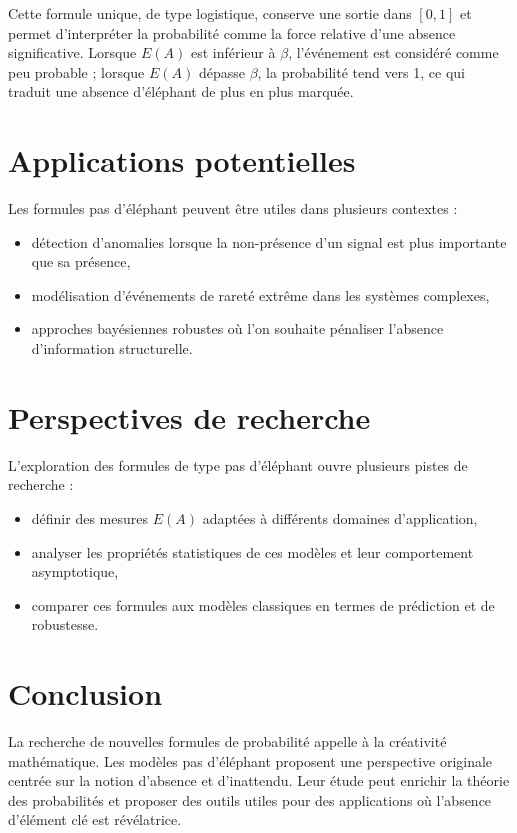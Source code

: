 \documentclass{article}
\begin{document}
Cette formule unique, de type logistique, conserve une sortie dans $[0,1]$ et permet d'interpréter la probabilité comme la force relative d'une absence significative. Lorsque $E(A)$ est inférieur à $\beta$, l'événement est considéré comme peu probable ; lorsque $E(A)$ dépasse $\beta$, la probabilité tend vers 1, ce qui traduit une absence d'éléphant de plus en plus marquée.

\section{Applications potentielles}
Les formules \og pas d'éléphant \fg{} peuvent être utiles dans plusieurs contextes :
\begin{itemize}
  \item détection d'anomalies lorsque la non-présence d'un signal est plus importante que sa présence,
  \item modélisation d'événements de rareté extrême dans les systèmes complexes,
  \item approches bayésiennes robustes où l'on souhaite pénaliser l'absence d'information structurelle.
\end{itemize}

\section{Perspectives de recherche}
L'exploration des formules de type \og pas d'éléphant \fg{} ouvre plusieurs pistes de recherche :
\begin{itemize}
  \item définir des mesures $E(A)$ adaptées à différents domaines d'application,
  \item analyser les propriétés statistiques de ces modèles et leur comportement asymptotique,
  \item comparer ces formules aux modèles classiques en termes de prédiction et de robustesse.
\end{itemize}

\section{Conclusion}
La recherche de nouvelles formules de probabilité appelle à la créativité mathématique. Les modèles \og pas d'éléphant \fg{} proposent une perspective originale centrée sur la notion d'absence et d'inattendu. Leur étude peut enrichir la théorie des probabilités et proposer des outils utiles pour des applications où l'absence d'élément clé est révélatrice.
\end{document}
